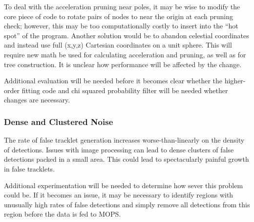 To deal with the acceleration pruning near poles, it may be wise to
modify the core piece of code to rotate pairs of nodes to near the
origin at each pruning check; however, this may be too computationally
costly to insert into the ``hot spot'' of the program.  Another
solution would be to abandon celestial coordinates and instead use
full (x,y,z) Cartesian coordinates on a unit sphere.  This will
require new math be used for calculating acceleration and pruning, as
well as for tree construction.  It is unclear how performance will be
affected by the change.

Additional evaluation will be needed before it becomes clear whether
the higher-order fitting code and chi squared probability filter will
be needed whether changes are necessary. 



\subsubsection{Dense and Clustered Noise}

The rate of false tracklet generation increases worse-than-linearly on
the density of detections. Issues with image processing can lead to
dense clusters of false detections packed in a small area.  This could
lead to spectacularly painful growth in false tracklets.

Additional experimentation will be needed to determine how sever this
problem could be.  If it becomes an issue, it may be necessary to
identify regions with unusually high rates of false detections and
simply remove all detections from this region before the data is fed
to MOPS.


